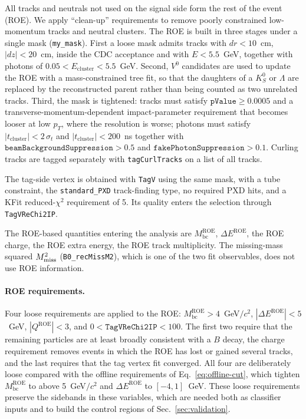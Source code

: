 All tracks and neutrals not used on the signal side form the rest of the event (ROE). We apply ``clean-up'' requirements to remove poorly constrained low-momentum tracks and neutral clusters.
The ROE
is built in three stages under a single mask (\texttt{my\_mask}).
First a loose mask admits tracks with $dr < 10$~cm, $|dz| < 20$~cm, inside the
CDC acceptance and with $E < 5.5$~GeV, together with photons of
$0.05 < E_{\mathrm{cluster}} < 5.5$~GeV.
Second, $V^{0}$ candidates are used to update the ROE with a mass-constrained
tree fit, so that the daughters of a $K^{0}_{S}$ or $\Lambda$ are replaced by
the reconstructed parent rather than being counted as two unrelated tracks.
Third, the mask is tightened: tracks must satisfy
$\texttt{pValue} \geq 0.0005$ and a transverse-momentum-dependent
impact-parameter requirement that becomes looser at low $p_{T}$, where the
resolution is worse; photons must satisfy
$|t_{\mathrm{cluster}}| < 2\,\sigma_{t}$ and $|t_{\mathrm{cluster}}| < 200$~ns
together with $\texttt{beamBackgroundSuppression} > 0.5$ and
$\texttt{fakePhotonSuppression} > 0.1$.
Curling tracks are tagged separately with \texttt{tagCurlTracks} on a list of all
tracks.


The tag-side vertex is obtained with \texttt{TagV} using the same mask, with a
tube constraint, the \texttt{standard\_PXD} track-finding type, no required
PXD hits, and a KFit reduced-$\chi^{2}$ requirement of 5.
Its quality enters the selection through \texttt{TagVReChi2IP}.

The ROE-based quantities entering the analysis are
$M_{\mathrm{bc}}^{\mathrm{ROE}}$, $\Delta E^{\mathrm{ROE}}$, the ROE charge,
the ROE extra energy, the ROE track multiplicity. The missing-mass
squared $M_{\mathrm{miss}}^{2}$ (\texttt{B0\_recMissM2}), which is one of the two fit
observables, does not use ROE information.
 

\paragraph{ROE requirements.}
Four loose requirements are applied to the ROE:
$M_{\mathrm{bc}}^{\mathrm{ROE}} > 4$~GeV$/c^{2}$,
$|\Delta E^{\mathrm{ROE}}| < 5$~GeV,
$|Q^{\mathrm{ROE}}| < 3$, and $0 < \texttt{TagVReChi2IP} < 100$.
The first two require that the remaining particles are at least broadly
consistent with a $B$ decay, the charge requirement removes events in which the
ROE has lost or gained several tracks, and the last requires that the tag
vertex fit converged.
All four are deliberately loose compared with the offline requirements of
Eq.~\eqref{eq:offline-cut}, which tighten
$M_{\mathrm{bc}}^{\mathrm{ROE}}$ to above 5~GeV$/c^{2}$ and
$\Delta E^{\mathrm{ROE}}$ to $[-4, 1]$~GeV.
These loose requirements preserve the sidebands in these variables, which
are needed both as classifier inputs and to build the control regions of
Sec.~\ref{sec:validation}. 

